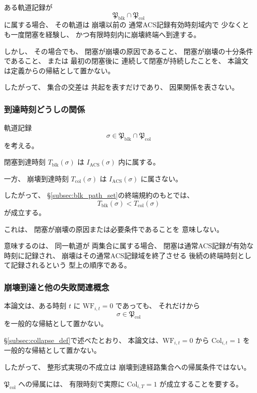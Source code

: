 \begin{remark}[閉塞経路集合と崩壊到達経路集合の交差]
\label{rem:blk_col_intersection}
ある軌道記録が
\[
  \mathfrak{P}_{\mathrm{blk}}
  \cap
  \mathfrak{P}_{\mathrm{col}}
\]
に属する場合、
その軌道は
崩壊以前の
通常ACS記録有効時刻域内で
少なくとも一度閉塞を経験し、
かつ有限時刻内に崩壊終端へ到達する。

しかし、
その場合でも、
閉塞が崩壊の原因であること、
閉塞が崩壊の十分条件であること、
または
最初の閉塞後に
連続して閉塞が持続したことを、
本論文は定義からの帰結として置かない。

したがって、
集合の交差は
共起を表すだけであり、
因果関係を表さない。
\end{remark}

\subsubsection{到達時刻どうしの関係}

\begin{remark}
\label{rem:blk_col_time_relation}
軌道記録
\[
  \sigma
  \in
  \mathfrak{P}_{\mathrm{blk}}
  \cap
  \mathfrak{P}_{\mathrm{col}}
\]
を考える。

閉塞到達時刻
$T_{\mathrm{blk}}(\sigma)$
は
$I_{\mathrm{ACS}}(\sigma)$
内に属する。

一方、
崩壊到達時刻
$T_{\mathrm{col}}(\sigma)$
は
$I_{\mathrm{ACS}}(\sigma)$
に属さない。

したがって、
\S\ref{subsec:blk_path_set}の終端規約のもとでは、
\[
  T_{\mathrm{blk}}(\sigma)
  <
  T_{\mathrm{col}}(\sigma)
\]
が成立する。

これは、
閉塞が崩壊の原因または必要条件であることを
意味しない。

意味するのは、
同一軌道が
両集合に属する場合、
閉塞は通常ACS記録が有効な時刻に記録され、
崩壊はその通常ACS記録域を終了させる
後続の終端時刻として記録されるという
型上の順序である。
\end{remark}

\subsubsection{崩壊到達と他の失敗関連概念}

\begin{remark}[整形式実現の不成立と崩壊到達経路集合への帰属の関係]
\label{rem:wf_not_col_path}
本論文は、ある時刻 $t$ に
$\mathrm{WF}_{i,t}=0$
であっても、
それだけから
\[
  \sigma\in\mathfrak{P}_{\mathrm{col}}
\]
を一般的な帰結として置かない。

\S\ref{subsec:collapse_def}で述べたとおり、
本論文は、$\mathrm{WF}_{i,t}=0$ から $\mathrm{Col}_{i,t}=1$ を
一般的な帰結として置かない。

したがって、
整形式実現の不成立は
崩壊到達経路集合への帰属条件ではない。

$\mathfrak{P}_{\mathrm{col}}$
への帰属には、
有限時刻で実際に
$\mathrm{Col}_{i,T}=1$
が成立することを要する。
\end{remark}

